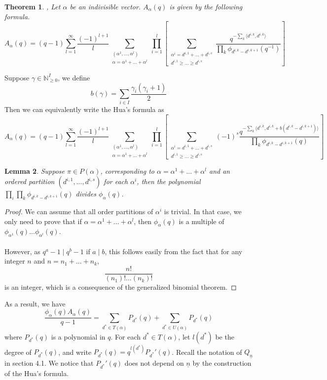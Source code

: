 \documentclass[12pt]{amsart}
\theoremstyle{plain}
\newtheorem{thm}{Theorem}[section]
\newtheorem{lem}[thm]{Lemma}
\theoremstyle{definition}
\theoremstyle{remark}
\begin{document}
\begin{thm} \cite[Theorem 4.6]{hua2000counting},\cite[Theorem 4.1]{zveryk2025stabilisation} Let $\alpha$ be an indivisible vector. $A_{\alpha}(q)$ is given by the following formula.
$$A_{\alpha}(q)=(q-1)\sum_{l=1}^{\infty}\frac{(-1)^{l+1}}
{l}\sum_{\substack{(\alpha^1,...,\alpha^l)\\\alpha=\alpha^1+...+\alpha^l}}\prod_{i=1}^l\left[\sum_{\substack{\alpha^i=d^{i,1}+...+d^{i,s}\\d^{i,1}\geq...\geq d^{i,s}}}\frac{q^{-\sum_k\langle d^{i,k},d^{i,k}\rangle}}{\prod_k\phi_{d^{i,k}-d^{i,k+1}}(q^{-1})}\right]$$
\end{thm}
\hspace{-12pt} Suppose $\gamma\in\mathbb N_{\geq 0}^I$, we define 
$$b(\gamma)=\sum_{i\in I}\frac{\gamma_i(\gamma_i+1)}{2}$$
Then we can equivalently write the Hua's formula as
$$A_{\alpha}(q)=(q-1)\sum_{l=1}^{\infty}\frac{(-1)^{l+1}}
{l}\sum_{\substack{(\alpha^1,...,\alpha^l)\\\alpha=\alpha^1+...+\alpha^l}}\prod_{i=1}^l\left[\sum_{\substack{\alpha^i=d^{i,1}+...+d^{i,s}\\d^{i,1}\geq...\geq d^{i,s}}}(-1)^s\frac{q^{-\sum_k\langle d^{i,k},d^{i,k}+b(d^{i,k}-d^{i,k+1})\rangle}}{\prod_k\phi_{d^{i,k}-d^{i,k+1}}(q)}\right]$$
\begin{lem}
Suppose $\pi\in P(\alpha)$, corresponding to $\alpha=\alpha^1+...+\alpha^l$ and an ordered partition $(d^{i,1},...,d^{i,s})$ for each $\alpha^i$, then the polynomial $\prod_i\prod_k\phi_{d^{i,k}-d^{i,k+1}}(q)$ divides $\phi_{\alpha}(q)$.
\end{lem}
\begin{proof}
We can assume that all order partitions of $\alpha^i$ is trivial. In that case, we only need to prove that if $\alpha=\alpha^1+...+\alpha^l$, then 
$\phi_{\alpha}(q)$ is a multiple of $\phi_{\alpha^1}(q)...\phi_{\alpha^l}(q)$.
\\~\\ However, as $q^a-1\mid q^b-1$ if $a\mid b$, this follows easily from the fact that for any integer $n$ and $n=n_1+...+n_k$,
$$\frac{n!}{(n_1)!...(n_k)!}$$
is an integer, which is a consequence of the generalized binomial theorem.
\end{proof}
\hspace{-13pt}As a result, we have
$$\frac{\phi_{\alpha}(q)A_{\alpha}(q)}{q-1}=\sum_{d^*\in T(\alpha)}P_{d^*}(q)+\sum_{d^*\in U(\alpha)}P_{d^*}(q)$$
where $P_{d^*}(q)$ is a polynomial in $q$. For each $d^*\in T(\alpha)$, let $l(d^*)$ be the degree of $P_{d^*}(q)$, and write $P_{d^*}(q)=q^{l(d^*)}P_{d^*}'(q)$. Recall the notation of $Q_{\underline{n}}$ in section 4.1. We notice that $P_{d^*}'(q)$ does not depend on $\underline{n}$ by the construction of the Hua's formula. 
\end{document}
